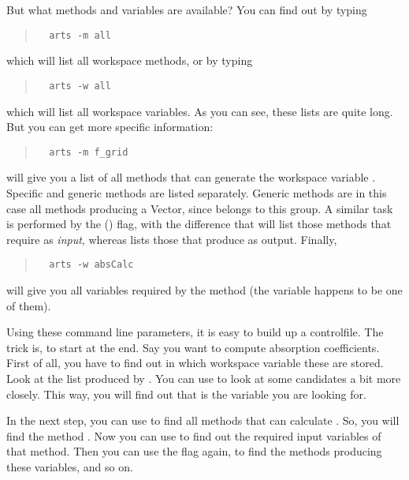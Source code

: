 But what methods and variables are available? You can find out by
typing
\begin{quote}
\begin{verbatim}
  arts -m all
\end{verbatim}
\end{quote}
which will list all workspace methods, or by typing 
\begin{quote}
\begin{verbatim}
  arts -w all
\end{verbatim}
\end{quote}
which will list all workspace variables. As you can see, these lists
are quite long. But you can get more specific information:
\begin{quote}
\begin{verbatim}
  arts -m f_grid
\end{verbatim}
\end{quote}
will give you a list of all methods that can generate the workspace
variable . Specific and generic methods are listed
separately. Generic methods are in this case all methods producing a
Vector, since  belongs to this group. A similar task is
performed by the  () flag, with the difference
that  will list those methods that require
 as \emph{input}, whereas  lists
those that produce  as output. Finally,
\begin{quote}
\begin{verbatim}
  arts -w absCalc
\end{verbatim}
\end{quote}
will give you all variables required by the method 
(the variable  happens to be one of them).

Using these command line parameters, it is easy to build up a
controlfile. The trick is, to start at the end. Say you want to
compute absorption coefficients. First of all, you have to find out
in which workspace variable these are stored. Look at the list
produced by . You can use  to look at
some candidates a bit more closely. This way, you will find out that
 is the variable you are looking for.

In the next step, you can use  to find all methods
that can calculate . So, you will find the method
. Now you can use  to find out the
required input variables of that method. Then you can use the
 flag again, to find the methods producing these variables,
and so on.

